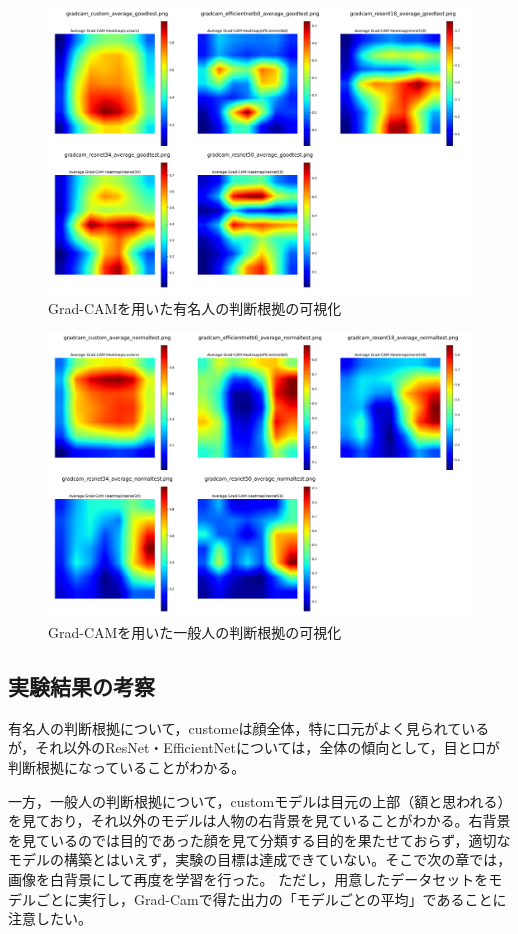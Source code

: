 \documentclass[a4paper,11pt,titlepage]{jsarticle}
\begin{document}
	
\begin{figure}[htbp]
    \centering
    \includegraphics[width=1.1\textwidth]{combined_images_good.png}
    \caption{Grad-CAMを用いた有名人の判断根拠の可視化}
    \label{fig:gradcam_good}
\end{figure}
\begin{figure}[H]
    \centering
    \includegraphics[width=1.1\textwidth]{combined_images_normal.png}
    \caption{Grad-CAMを用いた一般人の判断根拠の可視化}
    \label{fig:gradcam_normal}
\end{figure}


\subsection{実験結果の考察}
有名人の判断根拠について，customeは顔全体，特に口元がよく見られているが，それ以外のResNet・EfficientNetについては，全体の傾向として，目と口が判断根拠になっていることがわかる。\par
一方，一般人の判断根拠について，customモデルは目元の上部（額と思われる）を見ており，それ以外のモデルは人物の右背景を見ていることがわかる。右背景を見ているのでは目的であった顔を見て分類する目的を果たせておらず，適切なモデルの構築とはいえず，実験の目標は達成できていない。そこで次の章では，画像を白背景にして再度を学習を行った。
ただし，用意したデータセットをモデルごとに実行し，Grad-Camで得た出力の「モデルごとの平均」であることに注意したい。
\end{document}
